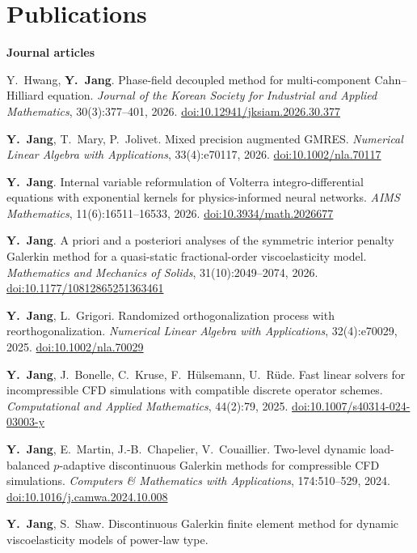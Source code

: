 \documentclass[11pt, a4paper]{article}
\newcommand{\cvsubheading}[1]{%
    \needspace{3\baselineskip}\par\vspace{0.18cm}%
    {\sffamily\bfseries\small\color{accent!85!black}#1}\par\vspace{0.12cm}%
}
\newlength{\datecolwidth}
\newenvironment{publist}[1][1]{%
    \begin{enumerate}[
        start=#1,
        label={\sffamily\small\color{accent}[\arabic*]},
        leftmargin=\datecolwidth,
        labelwidth=\datecolwidth-0.3cm,
        labelsep=0.3cm,
        align=left,
        topsep=0pt, partopsep=0pt, parsep=0pt,
        itemsep=0.24cm
    ]
}{\end{enumerate}}
\newcommand{\me}{\textbf{Y.~Jang}}
\newcommand{\doi}[1]{\mbox{\href{https://doi.org/#1}{\sffamily\footnotesize doi:#1}}}
\begin{document}
\section{Publications}

\cvsubheading{Journal articles}
\begin{publist}
    \item Y.~Hwang, \me.
        Phase-field decoupled method for multi-component Cahn--Hilliard equation.
        \textit{Journal of the Korean Society for Industrial and Applied Mathematics}, 30(3):\allowbreak\mbox{377--401}, 2026. \doi{10.12941/jksiam.2026.30.377}
    \item \me, T.~Mary, P.~Jolivet.
        Mixed precision augmented GMRES.
        \textit{Numerical Linear Algebra with Applications}, 33(4):e70117, 2026. \doi{10.1002/nla.70117}
    \item \me.
        Internal variable reformulation of Volterra integro-differential equations with exponential kernels for physics-informed neural networks.
        \textit{AIMS Mathematics}, 11(6):\allowbreak\mbox{16511--16533}, 2026. \doi{10.3934/math.2026677}
    \item \me.
        A priori and a posteriori analyses of the symmetric interior penalty Galerkin method for a quasi-static fractional-order viscoelasticity model.
        \textit{Mathematics and Mechanics of Solids}, 31(10):\allowbreak\mbox{2049--2074}, 2026. \doi{10.1177/10812865251363461}
    \item \me, L.~Grigori.
        Randomized orthogonalization process with reorthogonalization.
        \textit{Numerical Linear Algebra with Applications}, 32(4):e70029, 2025. \doi{10.1002/nla.70029}
    \item \me, J.~Bonelle, C.~Kruse, F.~H\"ulsemann, U.~R\"ude.
        Fast linear solvers for incompressible CFD simulations with compatible discrete operator schemes.
        \textit{Computational and Applied Mathematics}, 44(2):79, 2025. \doi{10.1007/s40314-024-03003-y}
    \item \me, E.~Martin, J.-B.~Chapelier, V.~Couaillier.
        Two-level dynamic load-balanced $p$-adaptive discontinuous Galerkin methods for compressible CFD simulations.
        \textit{Computers \& Mathematics with Applications}, 174:\allowbreak\mbox{510--529}, 2024. \doi{10.1016/j.camwa.2024.10.008}
    \item \me, S.~Shaw.
        Discontinuous Galerkin finite element method for dynamic viscoelasticity models of power-law type.

\end{publist}
\end{document}
